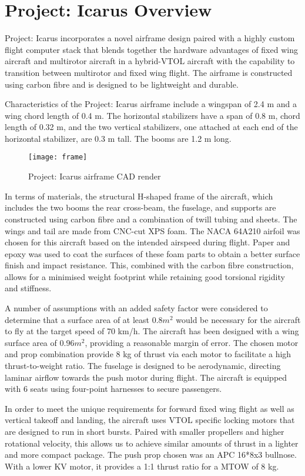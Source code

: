\section{Project: Icarus Overview}
\label{sec:overview}

Project: Icarus incorporates a novel airframe design paired with a highly
custom flight computer stack that blends together the hardware advantages of
fixed wing aircraft and multirotor aircraft in a hybrid-VTOL aircraft with the
capability to transition  between multirotor and fixed wing flight. The
airframe is constructed using carbon  fibre and is designed to be lightweight
and durable.

Characteristics of the Project: Icarus airframe include a wingspan of 2.4 m and
a wing chord length of 0.4 m. The horizontal stabilizers have a span of 0.8 m,
chord length of 0.32 m, and the two vertical stabilizers, one attached at each
end of the horizontal stabilizer, are 0.3 m tall. The booms are 1.2 m long.

\begin{figure}[ht]
        \centering
        \texttt{[image: frame]}
        \caption{Project: Icarus airframe CAD render}
\end{figure}

In terms of materials, the structural H-shaped frame of the aircraft, which
includes the two booms the rear cross-beam, the fuselage, and supports are
constructed using carbon fibre and a combination of twill tubing and sheets.
The wings and tail are made from CNC-cut XPS foam. The NACA 64A210 airfoil was
chosen for this aircraft based on the intended airspeed during flight. Paper
and epoxy was used to coat the surfaces of these foam parts to obtain a better
surface finish and impact resistance. This, combined with the carbon fibre
construction, allows for a minimised weight footprint while retaining good
torsional rigidity and stiffness. 

A number of assumptions with an added safety factor were considered to
determine that a surface area of at least $0.8 m^2$ would be necessary for the
aircraft to fly at the target speed of 70 km/h. The aircraft has been designed
with a wing surface area of $0.96 m^2$, providing a reasonable margin of error.
The chosen motor and prop combination provide 8 kg of thrust via each motor to
facilitate a high thrust-to-weight ratio. The fuselage is designed to be
aerodynamic, directing laminar airflow towards the push motor during flight.
The aircraft is equipped with 6 seats using four-point harnesses to secure
passengers.

In order to meet the unique requirements for forward fixed wing flight as well
as vertical takeoff and landing, the aircraft uses VTOL specific locking motors
that are designed to run in short bursts. Paired with smaller propellers and
higher rotational velocity, this allows us to achieve similar amounts of thrust
in a lighter and more compact package. The push prop chosen was an APC 16*8x3
bullnose. With a  lower KV motor, it provides a 1:1 thrust ratio for a MTOW of
8 kg.
